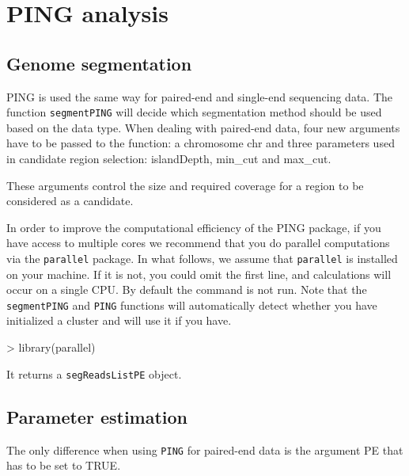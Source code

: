 \documentclass[11pt]{article}
\begin{document}
\section{PING analysis}

\subsection{Genome segmentation}
PING is used the same way for paired-end and single-end sequencing data. The
function \texttt{segmentPING} will decide which segmentation method should be
used based on the data type. 
When dealing with paired-end data, four new arguments have to be passed to the
function: a chromosome chr and three parameters used in candidate region
selection: islandDepth, min_cut and max_cut.

These arguments control the size and required coverage for a region to be
considered as a candidate.

In order to improve the computational efficiency of the PING package, if you
have access to multiple cores we recommend that you do parallel computations via
the \texttt{parallel} package. In what follows, we assume that \texttt{parallel}
is installed on your machine. If it is not, you could omit the first line, and
calculations will occur on a single CPU. By default the command is not run. Note
that the \texttt{segmentPING} and \texttt{PING} functions will automatically
detect whether you have initialized a cluster and will use it if you have.

\begin{Schunk}
\begin{Sinput}
> library(parallel)
\end{Sinput}
\end{Schunk}


\begin{Schunk}
\end{Schunk}

It returns a \texttt{segReadsListPE} object.


\subsection{Parameter estimation}
The only difference when using \texttt{PING} for paired-end data is the argument PE that has to be set to TRUE.
\end{document}
